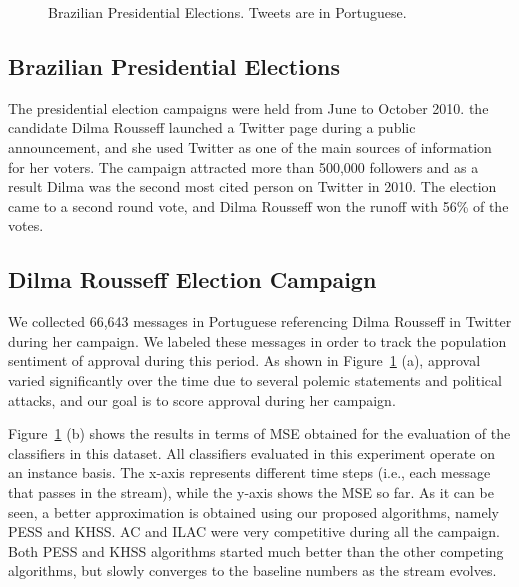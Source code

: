 \documentclass{sig-alternate}
\begin{document}
\begin{figure}[htp!]
\caption{Brazilian Presidential Elections. Tweets are in Portuguese.}
\label{fig:dilma}
\end{figure}

\subsection{Brazilian Presidential Elections}

The presidential election campaigns were held from June to October 2010.
the candidate Dilma Rousseff launched a Twitter page during a public announcement, and she used Twitter as one of the main sources of information for her voters. The campaign attracted more than 500,000 followers and
as a result Dilma was the second most cited person on Twitter in 2010.
The election came to a second round vote, and Dilma Rousseff won the runoff with 56\% of the votes.

\subsection*{Dilma Rousseff Election Campaign}
We collected 66,643 messages in Portuguese referencing Dilma Rousseff in Twitter during her campaign. We labeled these messages in order to track the population sentiment of approval during this period. As shown in Figure~\ref{fig:dilma} (a), approval varied significantly over the time due to several polemic statements and political attacks, and our goal is to score approval during her campaign.

Figure~\ref{fig:dilma} (b) shows the results in terms of MSE obtained for the evaluation of the classifiers in this dataset. All classifiers evaluated in this experiment operate on an instance basis.
The x-axis represents different time steps (i.e., each message that
passes in the stream), while the y-axis shows the MSE so far.
As it can be seen, a better approximation is obtained using our proposed algorithms, namely PESS and KHSS.
AC and ILAC were very competitive during all the campaign. Both PESS and KHSS algorithms started much better than the other competing algorithms, but slowly converges to the baseline numbers as the stream evolves.
\end{document}
